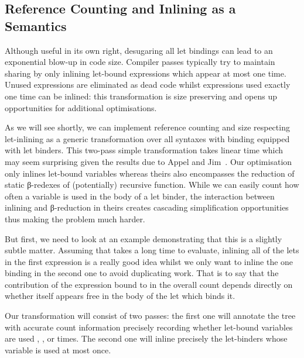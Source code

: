 \subsection{Reference Counting and Inlining as a Semantics}\label{section:inlining}

Although useful in its own right, desugaring all let bindings can lead
to an exponential blow-up in code size. Compiler passes typically try
to maintain sharing by only inlining let-bound expressions which appear
at most one time. Unused expressions are eliminated as dead code whilst
expressions used exactly one time can be inlined: this transformation is
size preserving and opens up opportunities for additional optimisations.

As we will see shortly, we can implement reference counting and size
respecting let-inlining as a generic transformation over all syntaxes
with binding equipped with let binders. This two-pass simple transformation
takes linear time which may seem surprising given the results due to Appel and
Jim~\citeyear{DBLP:journals/jfp/AppelJ97}. Our optimisation only inlines
let-bound variables whereas theirs also encompasses the reduction of static
β-redexes of (potentially) recursive function. While we can easily count how
often a variable is used in the body of a let binder, the interaction between
inlining and β-reduction in theirs creates cascading simplification opportunities
thus making the problem much harder.

But first, we need to look at an example demonstrating that this is a
slightly subtle matter. Assuming that  takes a long time
to evaluate, inlining all of the lets in the first expression is a really
good idea whilst we only want to inline the one binding  in the
second one to avoid duplicating work. That is to say that the contribution
of the expression bound to  in the overall count depends directly
on whether  itself appears free in the body of the let which binds it.

\begin{figure}[h]
\begin{minipage}{0.45\textwidth}
\end{minipage}
\begin{minipage}{0.45\textwidth}
\end{minipage}
\end{figure}

Our transformation will consist of two passes: the first one will annotate
the tree with accurate count information precisely recording whether
let-bound variables are used , , or  times.
The second one will inline precisely the let-binders whose variable is
used at most once.

